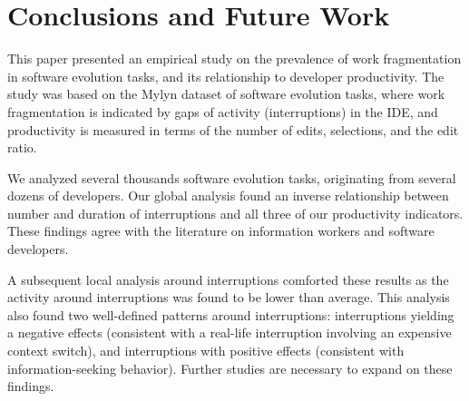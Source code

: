 \documentclass[conference]{IEEEtran}
\begin{document}
\section{Conclusions and Future Work}
This paper presented an empirical study on the prevalence of work fragmentation in software evolution tasks, and its relationship to developer productivity. The study was based on the Mylyn dataset of software evolution tasks, where work fragmentation is indicated by gaps of activity (interruptions) in the IDE, and productivity is measured in terms of the number of edits, selections, and the edit ratio.

We analyzed several thousands software evolution tasks, originating from several dozens of developers. Our global analysis found an inverse relationship between number and duration of interruptions and all three of our productivity indicators. These findings agree with the literature on information workers and software developers. 

A subsequent local analysis around interruptions comforted these results as the activity around interruptions was found to be lower than average. This analysis also found two well-defined patterns around interruptions: interruptions yielding a negative effects (consistent with a real-life interruption involving an expensive context switch), and interruptions with positive effects (consistent with information-seeking behavior). Further studies are necessary to expand on these findings.


\ifCLASSOPTIONcaptionsoff
  \newpage
\fi







\end{document}
